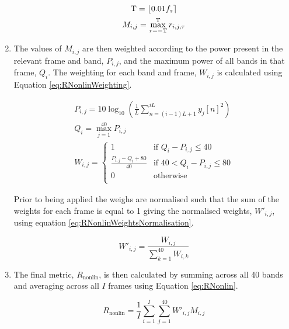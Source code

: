 \begin{enumerate}
				\begin{gather}
					\mathrm{T} = \left\lfloor0.01f_{s}\right\rceil \nonumber \\
					M_{i,j} = \max_{\tau = -\mathrm{T}}^{\mathrm{T}} r_{i,j,\tau}
					\label{eq:RNonlinMaxCrossCorrelation}
				\end{gather}

			\item The values of $M_{i,j}$ are then weighted according to the power present in the relevant frame
				and band, $P_{i,j}$, and the maximum power of all bands in that frame, $Q_{i}$. The
				weighting for each band and frame, $W_{i,j}$ is calculated using Equation
				\ref{eq:RNonlinWeighting}.

				\begin{gather}
					P_{i,j} = 10\log_{10} \left( \frac{1}{L} 
							\sum_{n=(i-1)L+1}^{iL} y_{j}[n]^{2}\right) \nonumber \\
					Q_{i} = \max_{j = 1}^{40} P_{i,j} \nonumber \\
					W_{i,j} = \begin{cases}
						1 & \text{if $Q_{i} - P_{i,j} \leq 40$} \\
						\frac{P_{i,j} - Q_{i} + 80}{40} & 
							\text{if $40 < Q_{i} - P_{i,j} \leq 80$} \\
						0 & \text{otherwise} \\
					\end{cases}
					\label{eq:RNonlinWeighting}
				\end{gather}

				Prior to being applied the weighs are normalised such that the sum of the weights for each
				frame is equal to 1 giving the normalised weights, $W'_{i,j}$, using equation
				\ref{eq:RNonlinWeightsNormalisation}.

				\begin{equation}
					W'_{i,j} = \frac{W_{i, j}}{\sum_{k = 1}^{40} W_{i,k}}
					\label{eq:RNonlinWeightsNormalisation}
				\end{equation}

			\item The final metric, $R_{\mathrm{nonlin}}$, is then calculated by summing across all 40 bands and
				averaging across all $I$ frames using Equation \ref{eq:RNonlin}.

				\begin{equation}
					R_{\mathrm{nonlin}} = \frac{1}{I} \sum_{i = 1}^{I} \sum_{j = 1}^{40} 
								W'_{i,j}M_{i,j}
					\label{eq:RNonlin}
				\end{equation}

		\end{enumerate}

